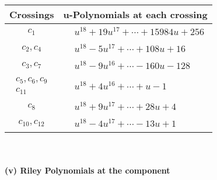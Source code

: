 \documentclass[1p]{elsarticle_modified}
\theoremstyle{definition}
\begin{document}
\begin{tabular}{m{50pt}|m{274pt}}
Crossings & \hspace{64pt}u-Polynomials at each crossing \\
\hline $$\begin{aligned}c_{1}\end{aligned}$$&$\begin{aligned}
&u^{18}+19 u^{17}+\cdots+15984 u+256
\end{aligned}$\\
\hline $$\begin{aligned}c_{2},c_{4}\end{aligned}$$&$\begin{aligned}
&u^{18}-5 u^{17}+\cdots+108 u+16
\end{aligned}$\\
\hline $$\begin{aligned}c_{3},c_{7}\end{aligned}$$&$\begin{aligned}
&u^{18}-9 u^{16}+\cdots-160 u-128
\end{aligned}$\\
\hline $$\begin{aligned}c_{5},c_{6},c_{9}\\c_{11}\end{aligned}$$&$\begin{aligned}
&u^{18}+4 u^{16}+\cdots+u-1
\end{aligned}$\\
\hline $$\begin{aligned}c_{8}\end{aligned}$$&$\begin{aligned}
&u^{18}+9 u^{17}+\cdots+28 u+4
\end{aligned}$\\
\hline $$\begin{aligned}c_{10},c_{12}\end{aligned}$$&$\begin{aligned}
&u^{18}-4 u^{17}+\cdots-13 u+1
\end{aligned}$\\
\hline
\end{tabular}\\~\\
\newpage\renewcommand{\arraystretch}{1}
\flushleft \textbf{(v) Riley Polynomials at the component}\newline \\
\end{document}
